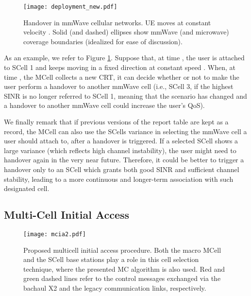 \documentclass[conference,a4paper]{IEEEtran}
\begin{document}
\begin{figure}[t!]
\centering
 \texttt{[image: deployment\_new.pdf]}
 \caption{Handover in mmWave cellular networks. UE moves at constant velocity . Solid (and dashed) ellipses show mmWave (and microwave) coverage boundaries (idealized for ease of  discussion).}
 \vspace{-0.6cm}
 \label{fig:HO}
\end{figure}

As an example, we refer to Figure \ref{fig:HO}. Suppose that, at time , the user is attached to SCell 1 and keeps moving in a fixed direction at constant speed . When, at time , the MCell collects a new CRT, it can decide whether or not to make the user perform a handover to another mmWave cell (i.e., SCell 3, if the highest SINR is no longer referred to SCell 1, meaning that the scenario has changed and a handover to another mmWave cell could increase the user's QoS).

We finally remark that if previous versions of the report table are kept as a record, the  MCell can also use the SCells variance in selecting the mmWave cell a user should attach to, after a handover is triggered. If a selected SCell shows a large variance (which reflects high channel instability), the user might need to handover again in the very near future. Therefore, it could be better to trigger a handover only to an SCell which grants both good SINR and sufficient channel stability, leading to a more continuous and longer-term association with such designated cell.



\subsection{Multi-Cell Initial Access}
\label{sec:MC-IA}

\begin{figure}[t!]
\centering
 \texttt{[image: mcia2.pdf]}
 \caption{Proposed multicell initial access procedure. Both the macro MCell and the SCell  base stations play a role in this cell selection technique, where the presented MC algorithm is also used. Red and green dashed lines refer to the control messages exchanged via the bachaul X2 and the legacy communication links, respectively.}
 \label{fig:initial_access_procedure}
\end{figure}
\end{document}
